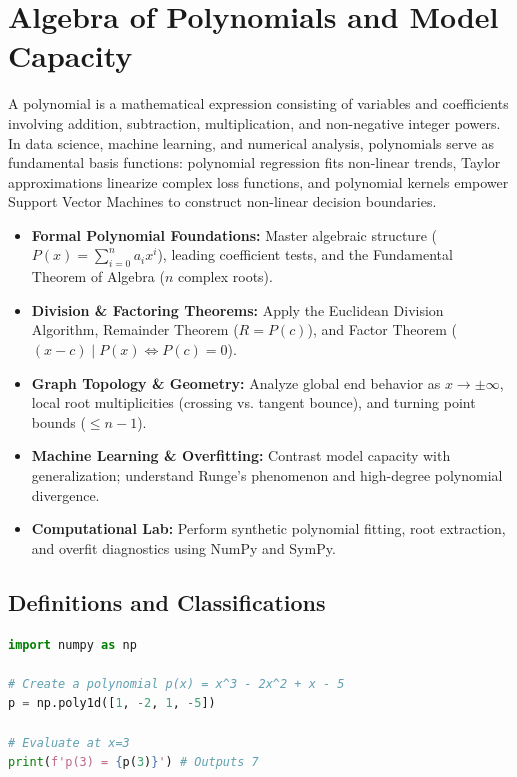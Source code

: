 \chapter{Algebra of Polynomials and Model Capacity}

A polynomial is a mathematical expression consisting of variables and coefficients involving addition, subtraction, multiplication, and non-negative integer powers. In data science, machine learning, and numerical analysis, polynomials serve as fundamental basis functions: polynomial regression fits non-linear trends, Taylor approximations linearize complex loss functions, and polynomial kernels empower Support Vector Machines to construct non-linear decision boundaries.

\vspace{0.3cm}
\begin{tcolorbox}[colback=primarylight, colframe=primarydark, title={\textbf{Executive Roadmap \& Learning Objectives}}]
\begin{itemize}
    \item \textbf{Formal Polynomial Foundations:} Master algebraic structure ($P(x) = \sum_{i=0}^n a_i x^i$), leading coefficient tests, and the Fundamental Theorem of Algebra ($n$ complex roots).
    \item \textbf{Division \& Factoring Theorems:} Apply the Euclidean Division Algorithm, Remainder Theorem ($R = P(c)$), and Factor Theorem ($(x - c) \mid P(x) \iff P(c) = 0$).
    \item \textbf{Graph Topology \& Geometry:} Analyze global end behavior as $x \to \pm\infty$, local root multiplicities (crossing vs. tangent bounce), and turning point bounds ($\le n - 1$).
    \item \textbf{Machine Learning \& Overfitting:} Contrast model capacity with generalization; understand Runge's phenomenon and high-degree polynomial divergence.
    \item \textbf{Computational Lab:} Perform synthetic polynomial fitting, root extraction, and overfit diagnostics using NumPy and SymPy.
\end{itemize}
\end{tcolorbox}
\vspace{0.3cm}

\section{Definitions and Classifications}

\begin{lstlisting}[language=Python, caption=Data Science: Evaluating Polynomials]
import numpy as np

# Create a polynomial p(x) = x^3 - 2x^2 + x - 5
p = np.poly1d([1, -2, 1, -5])

# Evaluate at x=3
print(f'p(3) = {p(3)}') # Outputs 7
\end{lstlisting}


